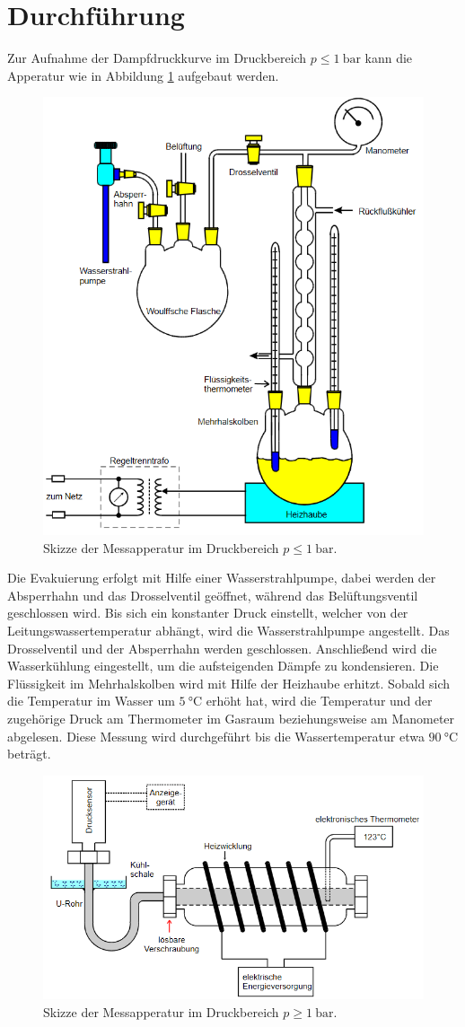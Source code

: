 \section{Durchführung}
\label{sec:Durchführung}
Zur Aufnahme der Dampfdruckkurve im Druckbereich $p \leq \SI{1}{\bar}$ kann die Apperatur wie in Abbildung \ref{fig:aufa} aufgebaut werden.
\begin{figure}
    \centering
    \caption{Skizze der Messapperatur im Druckbereich $p\leq \SI{1}{\bar}$.\cite{v203}}
    \label{fig:aufa}
    \includegraphics[width = 0.6 \textwidth]{pics/aufbau.png}
\end{figure}
Die Evakuierung erfolgt mit Hilfe einer Wasserstrahlpumpe, dabei werden der Absperrhahn und das Drosselventil geöffnet, während das Belüftungsventil geschlossen wird.
Bis sich ein konstanter Druck einstellt, welcher von der Leitungswassertemperatur abhängt, wird die Wasserstrahlpumpe angestellt.
Das Drosselventil und der Absperrhahn werden geschlossen.
Anschließend wird die Wasserkühlung eingestellt, um die aufsteigenden Dämpfe zu kondensieren. Die Flüssigkeit im Mehrhalskolben wird mit Hilfe der Heizhaube erhitzt.
Sobald sich die Temperatur im Wasser um $\SI{5}{\celsius}$ erhöht hat, wird die Temperatur und der zugehörige Druck am Thermometer im Gasraum beziehungsweise am Manometer abgelesen.
Diese Messung wird durchgeführt bis die Wassertemperatur etwa $\SI{90}{\celsius}$ beträgt.
\begin{figure}
    \centering
    \caption{Skizze der Messapperatur im Druckbereich $p \geq \SI{1}{\bar}$.\cite{v203}}
    \label{fig:aufb}
    \includegraphics[width = 0.6 \textwidth]{pics/aufbaub.png}
\end{figure}
